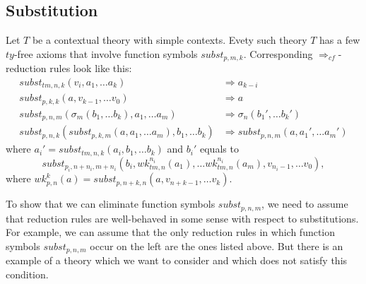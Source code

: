 \documentclass[reqno]{amsart}
\theoremstyle{definition}
\theoremstyle{remark}
\newcommand{\leftI}{\mathit{left}}
\newcommand{\rightI}{\mathit{right}}
\newcommand{\coe}{\mathit{coe}}
\newcommand{\subst}{\mathit{subst}}
\newcommand{\wk}{\mathit{wk}}
\newcommand{\ty}{\mathit{ty}}
\newcommand{\ctx}{\mathit{ctx}}
\newcommand{\tm}{\mathit{tm}}
\numberwithin{figure}{section}
\begin{document}
\subsection{Substitution}
\label{sec:subst}

Let $T$ be a contextual theory with simple contexts.
Evety such theory $T$ has a few $\ty$-free axioms that involve function symbols $\subst_{p,m,k}$.
Corresponding $\Rightarrow_{cf}$-reduction rules look like this:
\begin{align}
\subst_{\tm,n,k}(v_i, a_1, \ldots a_k) & \Rightarrow a_{k-i} \label{ax:v-left} \\
\subst_{p,k,k}(a, v_{k-1}, \ldots v_0) & \Rightarrow a \label{ax:v-right} \\
\subst_{p,n,m}(\sigma_m(b_1, \ldots b_k), a_1, \ldots a_m) & \Rightarrow \sigma_n(b_1', \ldots b_k') \label{ax:sigma} \\
\subst_{p,n,k}(\subst_{p,k,m}(a, a_1, \ldots a_m), b_1, \ldots b_k) & \Rightarrow \subst_{p,n,m}(a, a_1', \ldots a_m') \label{ax:assoc}
\end{align}
where $a_i' = \subst_{\tm,n,k}(a_i, b_1, \ldots b_k)$ and $b_i'$ equals to
\[ \subst_{p_i,n+n_i,m+n_i}(b_i, \wk^{n_i}_{\tm,n}(a_1), \ldots \wk^{n_i}_{\tm,n}(a_m), v_{n_i-1}, \ldots v_0), \]
where $\wk^k_{p,n}(a) = \subst_{p,n+k,n}(a, v_{n+k-1}, \ldots v_k)$.

To show that we can eliminate function symbols $\subst_{p,n,m}$, we need to assume that reduction rules are well-behaved in some sense with respect to substitutions.
For example, we can assume that the only reduction rules in which function symbols $\subst_{p,n,m}$ occur on the left are the ones listed above.
But there is an example of a theory which we want to consider and which does not satisfy this condition.
\end{document}
